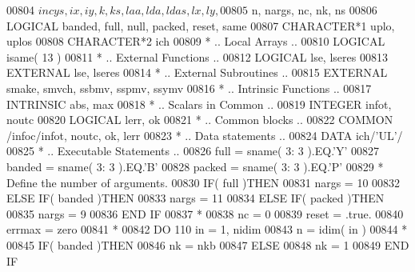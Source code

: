 \begin{DoxyCode}
00804      $                   incys, ix, iy, k, ks, laa, lda, ldas, lx, ly,
00805      $                   n, nargs, nc, nk, ns
00806       \textcolor{keywordtype}{LOGICAL}            banded, full, null, packed, reset, same
00807       \textcolor{keywordtype}{CHARACTER*1}        uplo, uplos
00808       \textcolor{keywordtype}{CHARACTER*2}        ich
00809 \textcolor{comment}{*     .. Local Arrays ..}
00810       \textcolor{keywordtype}{LOGICAL}            isame( 13 )
00811 \textcolor{comment}{*     .. External Functions ..}
00812       \textcolor{keywordtype}{LOGICAL}            lse, lseres
00813       \textcolor{keywordtype}{EXTERNAL}           lse, lseres
00814 \textcolor{comment}{*     .. External Subroutines ..}
00815       \textcolor{keywordtype}{EXTERNAL}           smake, smvch, ssbmv, sspmv, ssymv
00816 \textcolor{comment}{*     .. Intrinsic Functions ..}
00817       \textcolor{keywordtype}{INTRINSIC}          abs, max
00818 \textcolor{comment}{*     .. Scalars in Common ..}
00819       \textcolor{keywordtype}{INTEGER}            infot, noutc
00820       \textcolor{keywordtype}{LOGICAL}            lerr, ok
00821 \textcolor{comment}{*     .. Common blocks ..}
00822       \textcolor{keyword}{COMMON}             /infoc/infot, noutc, ok, lerr
00823 \textcolor{comment}{*     .. Data statements ..}
00824       \textcolor{keyword}{DATA}               ich/\textcolor{stringliteral}{'UL'}/
00825 \textcolor{comment}{*     .. Executable Statements ..}
00826       full = sname( 3: 3 ).EQ.\textcolor{stringliteral}{'Y'}
00827       banded = sname( 3: 3 ).EQ.\textcolor{stringliteral}{'B'}
00828       packed = sname( 3: 3 ).EQ.\textcolor{stringliteral}{'P'}
00829 \textcolor{comment}{*     Define the number of arguments.}
00830       \textcolor{keywordflow}{IF}( full )\textcolor{keywordflow}{THEN}
00831          nargs = 10
00832       \textcolor{keywordflow}{ELSE} \textcolor{keywordflow}{IF}( banded )\textcolor{keywordflow}{THEN}
00833          nargs = 11
00834       \textcolor{keywordflow}{ELSE} \textcolor{keywordflow}{IF}( packed )\textcolor{keywordflow}{THEN}
00835          nargs = 9
00836 \textcolor{keywordflow}{      END IF}
00837 \textcolor{comment}{*}
00838       nc = 0
00839       reset = .true.
00840       errmax = zero
00841 \textcolor{comment}{*}
00842       \textcolor{keywordflow}{DO} 110 in = 1, nidim
00843          n = idim( in )
00844 \textcolor{comment}{*}
00845          \textcolor{keywordflow}{IF}( banded )\textcolor{keywordflow}{THEN}
00846             nk = nkb
00847          \textcolor{keywordflow}{ELSE}
00848             nk = 1
00849 \textcolor{keywordflow}{         END IF}

\end{DoxyCode}
